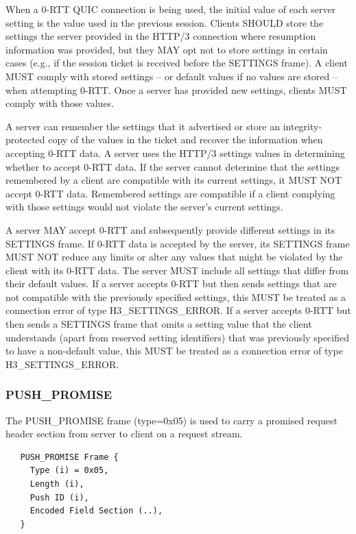 \documentclass{article}
\begin{document}
When a 0-RTT QUIC connection is being used, the initial value of each server setting is the value used in the previous session.  Clients SHOULD store the settings the server provided in the HTTP/3 connection where resumption information was provided, but they MAY opt not to store settings in certain cases (e.g., if the session ticket is received before the SETTINGS frame).  A client MUST comply with stored settings -- or default values if no values are stored -- when attempting 0-RTT.  Once a server has provided new settings, clients MUST comply with those values.

A server can remember the settings that it advertised or store an integrity-protected copy of the values in the ticket and recover the information when accepting 0-RTT data.  A server uses the HTTP/3 settings values in determining whether to accept 0-RTT data.  If the server cannot determine that the settings remembered by a client are compatible with its current settings, it MUST NOT accept 0-RTT data. Remembered settings are compatible if a client complying with those settings would not violate the server's current settings.

A server MAY accept 0-RTT and subsequently provide different settings in its SETTINGS frame.  If 0-RTT data is accepted by the server, its SETTINGS frame MUST NOT reduce any limits or alter any values that might be violated by the client with its 0-RTT data.  The server MUST include all settings that differ from their default values.  If a server accepts 0-RTT but then sends settings that are not compatible with the previously specified settings, this MUST be treated as a connection error of type H3\_SETTINGS\_ERROR.  If a server accepts 0-RTT but then sends a SETTINGS frame that omits a setting value that the client understands (apart from reserved setting identifiers) that was previously specified to have a non-default value, this MUST be treated as a connection error of type H3\_SETTINGS\_ERROR.

\subsubsection{PUSH\_PROMISE}

The PUSH\_PROMISE frame (type=0x05) is used to carry a promised request header section from server to client on a request stream.

\begin{verbatim}
   PUSH_PROMISE Frame {
     Type (i) = 0x05,
     Length (i),
     Push ID (i),
     Encoded Field Section (..),
   }
\end{verbatim}
\end{document}
